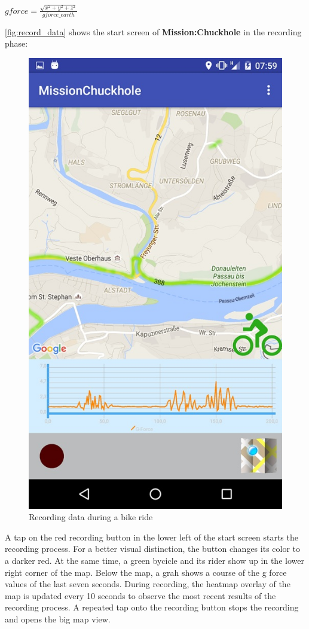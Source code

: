 \documentclass[10pt,a4paper]{article} %
\begin{document}
    
	\begin{center}
		$ gforce = \frac{\sqrt{x^2 + y^2 + z^2}}{gforce\_earth} $
	\end{center}
	
    	\autoref{fig:record_data} shows the start screen of \textbf{Mission:Chuckhole} in the recording phase:

	\begin{figure}[H]
	  \centering
    	  \includegraphics[scale=0.4]{pic2}
    	  \caption{Recording data during a bike ride }
	  \label{fig:record_data}
    \end{figure}
\noindent
    	A tap on the red recording button in the lower left of the start screen starts the recording process.
    	For a better visual distinction, the button changes its color to a darker red.
	At the same time, a green bycicle and its rider show up in the lower right corner of the map.
	Below the map, a grah shows a course of the g force values of the last seven seconds.
	During recording, the heatmap overlay of the map is updated every 10 seconds to observe the most recent results of the recording process.
	A repeated tap onto the recording button stops the recording and opens the big map view.
	
\end{document}
